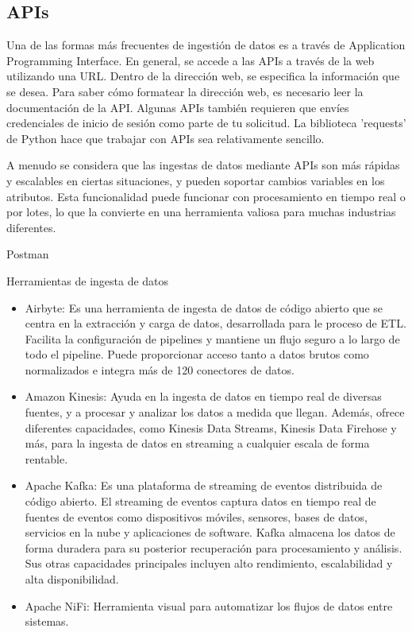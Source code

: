 \documentclass[12pt]{book}
\begin{document}
\subsection{APIs}
Una de las formas más frecuentes de ingestión de datos es a través de Application Programming Interface. 
En general, se accede a las APIs a través de la web utilizando una URL. Dentro de la dirección web, se especifica la información que se desea. Para saber cómo formatear la dirección web, es necesario leer la documentación de la API. Algunas APIs también requieren que envíes credenciales de inicio de sesión como parte de tu solicitud.
La biblioteca 'requests' de Python hace que trabajar con APIs sea relativamente sencillo.

A menudo se considera que las ingestas de datos mediante APIs son más rápidas y escalables en ciertas situaciones, y pueden soportar cambios variables en los atributos. Esta funcionalidad puede funcionar con procesamiento en tiempo real o por lotes, lo que la convierte en una herramienta valiosa para muchas industrias diferentes.

Postman 

Herramientas de ingesta de datos
\begin{itemize}
    \item Airbyte: Es una herramienta de ingesta de datos de código abierto que se centra en la extracción y carga de datos, desarrollada para le proceso de ETL. Facilita la configuración de pipelines y mantiene un flujo seguro a lo largo de todo el pipeline. Puede proporcionar acceso tanto a datos brutos como normalizados e integra más de 120 conectores de datos.
    \item Amazon Kinesis: Ayuda en la ingesta de datos en tiempo real de diversas fuentes, y a procesar y analizar los datos a medida que llegan. Además, ofrece diferentes capacidades, como Kinesis Data Streams, Kinesis Data Firehose y más, para la ingesta de datos en streaming a cualquier escala de forma rentable.
    \item Apache Kafka: Es una plataforma de streaming de eventos distribuida de código abierto. El streaming de eventos captura datos en tiempo real de fuentes de eventos como dispositivos móviles, sensores, bases de datos, servicios en la nube y aplicaciones de software. Kafka almacena los datos de forma duradera para su posterior recuperación para procesamiento y análisis. Sus otras capacidades principales incluyen alto rendimiento, escalabilidad y alta disponibilidad.
    \item Apache NiFi:  Herramienta visual para automatizar los flujos de datos entre sistemas.
\end{itemize}
\end{document}
